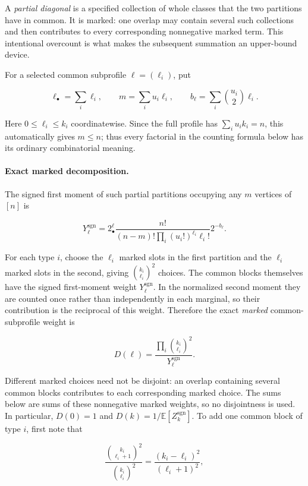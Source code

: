 \documentclass[11pt,reqno]{amsart}
\newcommand{\Exp}[1]{\mathbb{E}\!\left[#1\right]}
\begin{document}
A \emph{partial diagonal} is a specified collection of whole classes that
the two partitions have in common.  It is marked: one overlap may contain
several such collections and then contributes to every corresponding
nonnegative marked term.  This intentional overcount is what makes the
subsequent summation an upper-bound device.

For a selected common subprofile \(\ell=(\ell_i)\), put

\[
 \ell_\bullet=\sum_i\ell_i,\qquad
 m=\sum_i u_i\ell_i,\qquad
 b_\ell=\sum_i\binom{u_i}{2}\ell_i.                           \tag{7.1}
\]

Here \(0\le\ell_i\le k_i\) coordinatewise.  Since the full profile has
\(\sum_i u_i k_i=n\), this automatically gives \(m\le n\); thus every
factorial in the counting formula below has its ordinary combinatorial
meaning.

\paragraph{Exact marked decomposition.}
The signed first moment of such partial partitions occupying any
\(m\) vertices of \([n]\) is

\[
 Y_{\ell}^{\mathrm{sgn}}
 =2^\ell_\bullet\frac{n!}{(n-m)!\prod_i(u_i!)^{\ell_i}\ell_i!}
       2^{-b_\ell}.                                           \tag{7.2}
\]

For each type \(i\), choose the \(\ell_i\) marked slots in the first
partition and the \(\ell_i\) marked slots in the second, giving
\(\binom{k_i}{\ell_i}^2\) choices. The common blocks themselves have the
signed first-moment weight \(Y_\ell^{\mathrm{sgn}}\). In the normalized
second moment they are counted once rather than independently in each
marginal, so their contribution is the reciprocal of this weight.
Therefore the exact \emph{marked} common-subprofile weight is

\[
 D(\ell)=\frac{\prod_i\binom{k_i}{\ell_i}^2}
                 {Y_\ell^{\mathrm{sgn}}}.                         \tag{7.3}
\]

Different marked choices need not be disjoint: an overlap containing several
common blocks contributes to each corresponding marked choice. The sums below
are sums of these nonnegative marked weights, so no disjointness is used.
In particular,
\(D(0)=1\) and \(D(k)=1/\Exp{Z_k^{\mathrm{sgn}}}\).
To add one common block of type \(i\), first note that

\[
 \frac{\binom{k_i}{\ell_i+1}^2}{\binom{k_i}{\ell_i}^2}
 =\frac{(k_i-\ell_i)^2}{(\ell_i+1)^2},
\]
\end{document}
